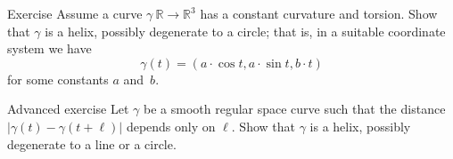 \begin{thm}{Exercise}\label{ex:cur+tor=helix}
Assume a curve $\gamma\:\mathbb{R}\to\mathbb{R}^3$ has a constant curvature and torsion.
Show that $\gamma$ is a helix, possibly degenerate to a circle;
that is, in a suitable coordinate system we have
\[\gamma(t)=(a\cdot \cos t,a\cdot\sin t, b\cdot t)\]
for some constants $a$ and~$b$.
\end{thm}


\begin{thm}{Advanced exercise}\label{ex:const-dist}
Let $\gamma$ be a smooth regular space curve such that the distance $|\gamma(t)-\gamma(t+\ell)|$ depends only on $\ell$.
Show that $\gamma$ is a helix, possibly degenerate to a line or a circle.
\end{thm}


